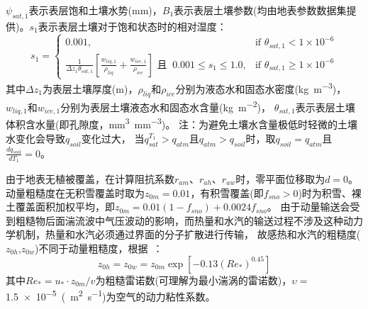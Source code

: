 $\psi_{sat,1}$表示表层饱和土壤水势(mm)，$B_1$表示表层土壤\citep{clapp1978empirical}参数(均由地表参数数据集提供)。$s_1$表示表层土壤对于饱和状态时的相对湿度：
\begin{equation}
s_{1}= \begin{cases}
   0.001, & \text {if } \theta_{sat, 1}<1 \times 10^{-6} \\ 
   \frac{1}{\Delta z_{1} \theta_{sat, 1}}\left[\frac{w_{liq, 1}}{\rho_{liq}}+\frac{w_{ice, 1}}{\rho_{ice}}\right]  \text{ 且  }\  0.001 \leq s_{1} \leq 1.0, & \text {if } \theta_{sat, 1} \geq 1 \times 10^{-6}
   \end{cases}
\end{equation}
其中$\Delta z_{1}$为表层土壤厚度(m)，$\rho_{liq}$和$\rho_{ice}$分别为液态水和固态水密度(\unit{kg.m^{-3}})，
$w_{liq,1}$和$w_{ice,1}$分别为表层土壤液态水和固态水含量(\unit{kg.m^{-2}})，
$\theta_{sat,1}$表示表层土壤体积含水量(即孔隙度，\unit{mm^3.mm^{-3}})。
注：为避免土壤水含量极低时轻微的土壤水变化会导致$q_{soil}$变化过大，
当$q_{sat}^{T_1}>q_{atm}$且$q_{atm}>q_{soil}$时，取$q_{soil} = q_{atm}$且$\frac{dq_{soil}}{dT_1} = 0$。


由于地表无植被覆盖，在计算阻抗系数$r_{am}$、$r_{ah}$、$r_{aw}$时，零平面位移取为$d=0$。动量粗糙度在无积雪覆盖时取为$z_{0m}=0.01$，有积雪覆盖(即$f_{sno}>0$)时为积雪、裸土覆盖面积加权平均，即$z_{0m}=0.01\left( 1-f_{sno} \right )+ 0.0024 f_{sno}$。
由于动量输送会受到粗糙物后面湍流波中气压波动的影响，而热量和水汽的输送过程不涉及这种动力学机制，热量和水汽必须通过界面的分子扩散进行传输，
故感热和水汽的粗糙度($z_{0h}$,$z_{0w}$)不同于动量粗糙度，根据~\citet{zeng1998effect}：
\begin{equation}\label{z0hw}
z_{0 h} = z_{0 w} = z_{0 m} \exp \left[-0.13\left(Re_{*}\right)^{0.45}\right]
\end{equation}
其中$Re_{*} = u_{*} \cdot z_{0 m} / v$为粗糙雷诺数(可理解为最小湍涡的雷诺数)，$\upsilon=$ \qty{1.5e-5}{(m^2.s^{-1}})为空气的动力粘性系数。


